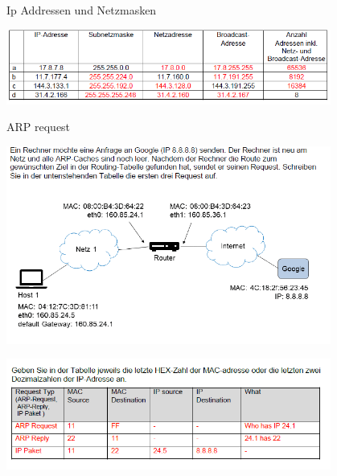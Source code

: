 \begin{example}{Ip Addressen und Netzmasken}

  \begin{center}
  \includegraphics[width=0.8\textwidth]{images/2024-06-20-18-18-53.png}
  \end{center}

\end{example}
\begin{example}{ARP request}\\

  \begin{center}
  \includegraphics[width=0.8\textwidth]{images/2024-06-20-18-20-15.png}
  \end{center}

  \begin{center}
  \includegraphics[width=0.8\textwidth]{images/2024-06-20-18-20-33.png}
  \end{center}
\end{example}

